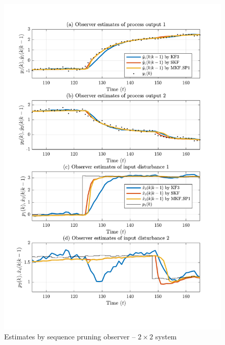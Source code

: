 \begin{figure}[htp]
	\centering
	\includegraphics[width=12cm]{images/rod_obs_sim2_all_seed_y_est2_SP1.pdf}
	\caption{Estimates by sequence pruning observer –  $2\times2$ system}
	\label{fig:rod-obs-sim2-yest-2-SF}
\end{figure}

